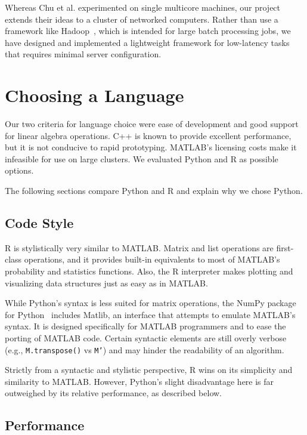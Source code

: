 \documentclass[%
  final,
  notitlepage,
  narroweqnarray,
  inline,
]{ieee}
\begin{document}
Whereas Chu et al. experimented on single multicore machines, our project
extends their ideas to a cluster of networked computers. Rather than use a
framework like Hadoop~\cite{hadoop}, which is intended for large batch
processing jobs, we have designed and implemented a lightweight framework for
low-latency tasks that requires minimal server configuration.

\section{Choosing a Language}

Our two criteria for language choice were ease of development and good support
for linear algebra operations. C++ is known to provide excellent performance,
but it is not conducive to rapid prototyping. MATLAB's licensing costs make it
infeasible for use on large clusters. We evaluated Python and R as possible
options.

The following sections compare Python and R and explain why we chose Python.

\subsection{Code Style}

R is stylistically very similar to MATLAB. Matrix and list operations are
first-class operations, and it provides built-in equivalents to most of
MATLAB's probability and statistics functions. Also, the R interpreter makes
plotting and visualizing data structures just as easy as in MATLAB.

While Python's syntax is less suited for matrix operations, the NumPy
package for Python~\cite{numpy} includes Matlib, an interface that attempts to
emulate MATLAB's syntax. It is designed specifically for MATLAB programmers and
to ease the porting of MATLAB code. Certain syntactic elements are still overly
verbose (e.g., \texttt{M.transpose()} vs \texttt{M'}) and may hinder the
readability of an algorithm.

Strictly from a syntactic and stylistic perspective, R wins on its simplicity
and similarity to MATLAB. However, Python's slight disadvantage here is far
outweighed by its relative performance, as described below.

\subsection{Performance}
\end{document}
